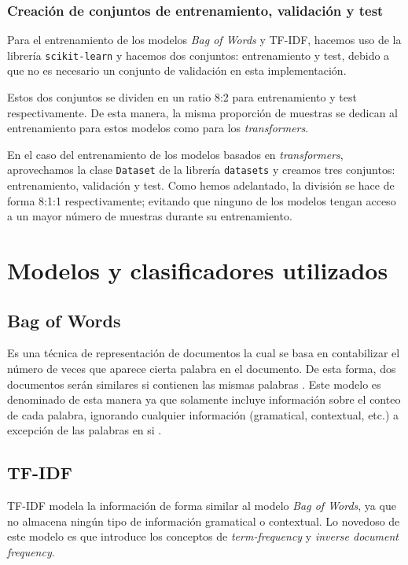 \subsubsection{Creación de conjuntos de entrenamiento, validación y test}

Para el entrenamiento de los modelos \textit{Bag of Words} y TF-IDF, hacemos uso de la librería \texttt{scikit-learn} \citep{scikit} y hacemos dos conjuntos: entrenamiento y test, debido a que no es necesario un conjunto de validación en esta implementación.

Estos dos conjuntos se dividen en un ratio 8:2 para entrenamiento y test respectivamente. De esta manera, la misma proporción de muestras se dedican al entrenamiento para estos modelos como para los \textit{transformers}.

En el caso del entrenamiento de los modelos basados en \textit{transformers}, aprovechamos la clase \texttt{Dataset} de la librería \texttt{datasets} \citep{datasets} y creamos tres conjuntos: entrenamiento, validación y test. Como hemos adelantado, la división se hace de forma 8:1:1 respectivamente; evitando que ninguno de los modelos tengan acceso a un mayor número de muestras durante su entrenamiento.

\section{Modelos y clasificadores utilizados}

\subsection{Bag of Words}

Es una técnica de representación de documentos la cual se basa en contabilizar el número de veces que aparece cierta palabra en el documento. De esta forma, dos documentos serán similares si contienen las mismas palabras \citep{Vajjala2020}. Este modelo es denominado de esta manera ya que solamente incluye información sobre el conteo de cada palabra, ignorando cualquier información (gramatical, contextual, etc.) a excepción de las palabras en si \citep{Eisenstein2019}.

\subsection{TF-IDF}

TF-IDF modela la información de forma similar al modelo \textit{Bag of Words}, ya que no almacena ningún tipo de información gramatical o contextual. Lo novedoso de este modelo es que introduce los conceptos de \textit{term-frequency} y \textit{inverse document frequency}.


